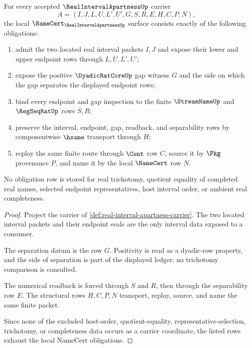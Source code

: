 \begin{theorem}
\label{thm:real-interval-apartness-namecert-obligations}
For every accepted $\RealIntervalApartnessUp$ carrier
$$
A=(I,J,L,U,L',U',G,S,R,E,H,C,P,N),
$$
the local $\NameCert_{\RealIntervalApartnessUp}$ surface consists exactly of the following obligations:
\begin{enumerate}
\item admit the two located real interval packets $I,J$ and expose their lower and upper endpoint rows through $L,U,L',U'$;
\item expose the positive $\DyadicRatCoreUp$ gap witness $G$ and the side on which the gap separates the displayed endpoint rows;
\item bind every endpoint and gap inspection to the finite $\StreamNameUp$ and $\RegSeqRatUp$ rows $S,R$;
\item preserve the interval, endpoint, gap, readback, and separability rows by componentwise $\hsame$ transport through $H$;
\item replay the same finite route through $\Cont$ row $C$, source it by $\Pkg$ provenance $P$, and name it by the local $\NameCert$ row $N$.
\end{enumerate}
No obligation row is stored for real trichotomy, quotient equality of completed real names, selected endpoint representatives, host interval order, or ambient real completeness.
\end{theorem}
\begin{proof}
Project the carrier of \autoref{def:real-interval-apartness-carrier}. The two located interval packets and their endpoint seals are the only interval data exposed to a consumer.

The separation datum is the row $G$. Positivity is read as a dyadic-row property, and the side of separation is part of the displayed ledger; no trichotomy comparison is consulted.

The numerical readback is forced through $S$ and $R$, then through the separability row $E$. The structural rows $H,C,P,N$ transport, replay, source, and name the same finite packet.

Since none of the excluded host-order, quotient-equality, representative-selection, trichotomy, or completeness data occurs as a carrier coordinate, the listed rows exhaust the local NameCert obligations.
\end{proof}

